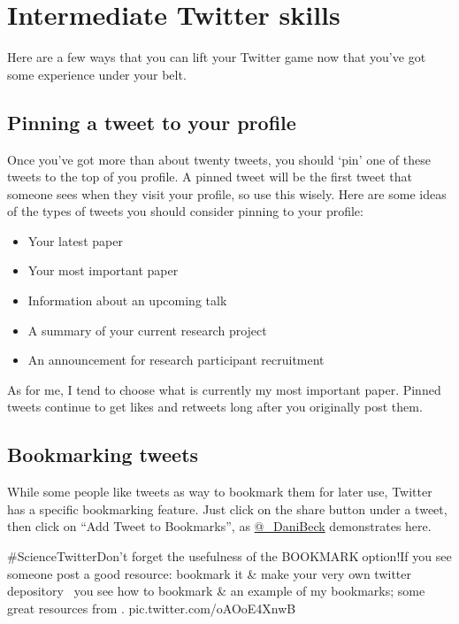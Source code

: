 \documentclass[]{book}
\providecommand{\tightlist}{%
  \setlength{\itemsep}{0pt}\setlength{\parskip}{0pt}}
\begin{document}
\hypertarget{intermediate-twitter-skills}{%
\chapter{Intermediate Twitter skills}\label{intermediate-twitter-skills}}

Here are a few ways that you can lift your Twitter game now that you've got some experience under your belt.

\hypertarget{pinning-a-tweet-to-your-profile}{%
\section{Pinning a tweet to your profile}\label{pinning-a-tweet-to-your-profile}}

Once you've got more than about twenty tweets, you should `pin' one of these tweets to the top of you profile. A pinned tweet will be the first tweet that someone sees when they visit your profile, so use this wisely. Here are some ideas of the types of tweets you should consider pinning to your profile:

\begin{itemize}
\tightlist
\item
  Your latest paper
\item
  Your most important paper
\item
  Information about an upcoming talk
\item
  A summary of your current research project
\item
  An announcement for research participant recruitment
\end{itemize}

As for me, I tend to choose what is currently my most important paper. Pinned tweets continue to get likes and retweets long after you originally post them.

\hypertarget{bookmarking-tweets}{%
\section{Bookmarking tweets}\label{bookmarking-tweets}}

While some people like tweets as way to bookmark them for later use, Twitter has a specific bookmarking feature. Just click on the share button under a tweet, then click on ``Add Tweet to Bookmarks'', as \href{https://twitter.com/_DaniBeck}{@\_DaniBeck} demonstrates here.

\#ScienceTwitterDon't forget the usefulness of the BOOKMARK🔖option!If you see someone post a good resource: bookmark it \& make your very own twitter depository🔖👇🏾you see how to bookmark \& an example of my bookmarks; some great resources from \citet{dsquintana}.\citet{AcademicChatter} pic.twitter.com/oAOoE4XnwB
\end{document}

